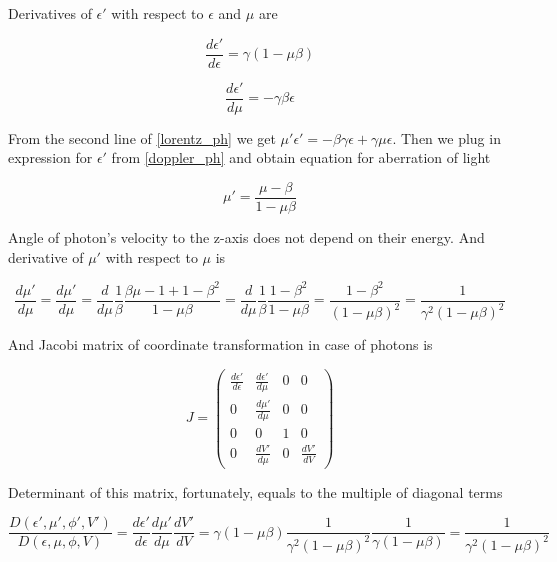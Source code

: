 Derivatives of $\epsilon'$ with respect to $\epsilon$ and $\mu$ are

\begin{equation}
	\frac{d\epsilon'}{d\epsilon}=\gamma(1-\mu\beta)
\end{equation}

\begin{equation}
	\frac{d\epsilon'}{d\mu}=-\gamma\beta\epsilon
\end{equation}

From the second line of \ref{lorentz_ph} we get
 $\mu'\epsilon'=-\beta\gamma\epsilon+\gamma\mu\epsilon$. Then we plug in expression for $\epsilon'$ from \ref{doppler_ph} and obtain equation for aberration of light
 
\begin{equation}\label{aberration_ph}
	\mu'=\frac{\mu-\beta}{1-\mu\beta}
\end{equation}

Angle of photon's velocity to the z-axis does not depend on their energy. And derivative of $\mu'$ with respect to $\mu$ is

\begin{equation}
	\frac{d\mu'}{d\mu} = \frac{d\mu'}{d\mu}=\frac{d}{d\mu}\frac{1}{\beta}\frac{\beta\mu-1+1-\beta^2}{1-\mu\beta}=\frac{d}{d\mu}\frac{1}{\beta}\frac{1-\beta^2}{1-\mu\beta}=\frac{1-\beta^2}{(1-\mu\beta)^2}=\frac{1}{\gamma^2(1-\mu\beta)^2}
\end{equation}

And Jacobi matrix of coordinate transformation in case of photons is

\begin{equation}
	J=\left(
	\begin{array}{cccc}
		\frac{d\epsilon'}{d\epsilon} & \frac{d\epsilon'}{d\mu}& 0 & 0\\
		0 & \frac{d\mu'}{d\mu} & 0 & 0\\
		0 & 0 & 1 & 0\\
		0 & \frac{dV'}{d\mu} & 0 & \frac{dV'}{dV}
	\end{array}
	\right)
\end{equation}

Determinant of this matrix, fortunately, equals to the multiple of diagonal terms

\begin{equation}\label{jacobian_ph}
	\frac{D(\epsilon',\mu',\phi',V')}{D(\epsilon,\mu,\phi,V)}=\frac{d\epsilon'}{d\epsilon}\frac{d\mu'}{d\mu}\frac{dV'}{dV}=\gamma(1-\mu\beta)\frac{1}{\gamma^2(1-\mu\beta)^2}\frac{1}{\gamma(1-\mu\beta)}=\frac{1}{\gamma^2(1-\mu\beta)^2}
\end{equation}

